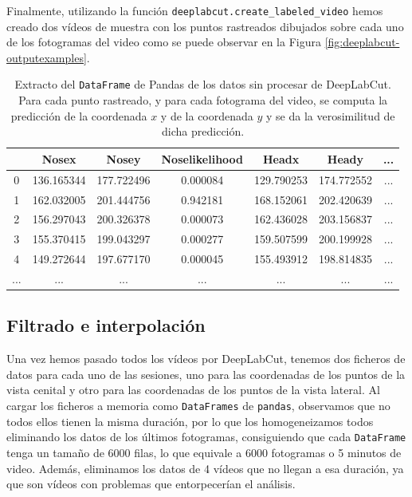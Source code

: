 Finalmente, utilizando la función \texttt{deeplabcut.create\_labeled\_video} hemos creado dos vídeos de muestra con los puntos rastreados dibujados sobre cada uno de los fotogramas del video como se puede observar en la Figura \ref{fig:deeplabcut-outputexamples}.
\begin{table}[h]
  \centering
  \begin{tabular}{|c|c|c|c|c|c|c|}
  \hline
    & Nosex & Nosey & Noselikelihood & Headx & Heady & ... \\
  \hline
  0 & 136.165344 & 177.722496 & 0.000084 & 129.790253 & 174.772552 & ... \\
  1 & 162.032005 & 201.444756 & 0.942181 & 168.152061 & 202.420639 & ... \\
  2 & 156.297043 & 200.326378 & 0.000073 & 162.436028 & 203.156837 & ... \\
  3 & 155.370415 & 199.043297 & 0.000277 & 159.507599 & 200.199928 & ... \\
  4 & 149.272644 & 197.677170 & 0.000045 & 155.493912 & 198.814835 & ... \\
  ... & ... & ... & ... & ... & ... & ... \\
  \hline
  \end{tabular}
  \caption[Datos de DeepLabCut]{Extracto del \texttt{DataFrame} de Pandas de los datos sin procesar de DeepLabCut. Para cada punto rastreado, y para cada fotograma del video, se computa la predicción de la coordenada $x$ y de la coordenada $y$ y se da la verosimilitud de dicha predicción.}
  \label{tab:df-example}
\end{table}

\subsection{Filtrado e interpolación}
Una vez hemos pasado todos los vídeos por DeepLabCut, tenemos dos ficheros de datos para cada uno de las sesiones, uno para las coordenadas de los puntos de la vista cenital y otro para las coordenadas de los puntos de la vista lateral. Al cargar los ficheros a memoria como \texttt{DataFrames} de \texttt{pandas}, observamos que no todos ellos tienen la misma duración, por lo que los homogeneizamos todos eliminando los datos de los últimos fotogramas, consiguiendo que cada \texttt{DataFrame} tenga un tamaño de 6000 filas, lo que equivale a 6000 fotogramas o 5 minutos de video. Además, eliminamos los datos de 4 vídeos que no llegan a esa duración, ya que son vídeos con problemas que entorpecerían el análisis.

